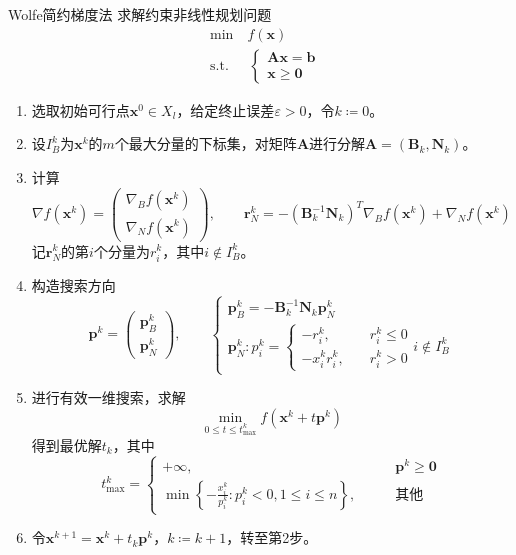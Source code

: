 \documentclass[lang = cn, scheme = chinese, thmcnt = section]{elegantbook}
\newcommand{\bs}{\boldsymbol}          %
\newcommand{\col}{\coloneqq}
\begin{document}
\begin{theorem}{Wolfe简约梯度法}
	求解约束非线性规划问题
	\begin{align*}
		& \text{min}  \quad f(\bs{x})\\
		& \text{s.t.} \;\, \quad \begin{cases}
			\bs{A} \bs{x} = \bs{b}\\
			\bs{x} \ge \bs{0}
		\end{cases}
	\end{align*}
	\begin{enumerate}
		\item 选取初始可行点$\bs{x}^0\in X_l$，给定终止误差$\varepsilon>0$，令$k\col 0$。
		\item 设$I_B^k$为$\bs{x}^k$的$m$个最大分量的下标集，对矩阵$\bs{A}$进行分解$\bs{A}=(\bs{B}_k,\bs{N}_k)$。
		\item 计算
		$$
		\nabla f(\bs{x}^k)=\begin{pmatrix}
			\nabla_B f(\bs{x}^k)\\
			\nabla_N f(\bs{x}^k)
		\end{pmatrix},\qquad
		\bs{r}_N^k
		=-(\bs{B}_k^{-1}\bs{N}_k)^T\nabla_Bf(\bs{x}^k)+\nabla_Nf(\bs{x}^k)
		$$
		记$\bs{r}_N^k$的第$i$个分量为$r_i^k$，其中$i\notin I_B^k$。
		\item 构造搜索方向%
		$$
		\bs{p}^k=\begin{pmatrix}
			\bs{p}^k_B\\
			\bs{p}^k_N
		\end{pmatrix},\qquad 
		\begin{cases}
			\bs{p}_B^k=-\bs{B}^{-1}_k\bs{N}_k\bs{p}_N^k\\
			\bs{p}_N^k:p_i^k=\begin{cases}
				-r_i^k,\quad & r_i^k\le 0\\
				-x_i^kr_i^k,\quad & r_i^k>0
			\end{cases}i\notin I_B^k
		\end{cases}
		$$
		\item 进行有效一维搜索，求解%
		$$
		\min_{0\le t \le t_{\text{max}}^k}f(\bs{x}^k+t\bs{p}^k)
		$$
		得到最优解$t_k$，其中%
		$$
		t_{\text{max}}^k=\begin{cases}
			+\infty,\qquad & \bs{p}^k\ge \bs{0}\\
			\min\left\{ -\frac{x_i^k}{p_i^k}:p_i^k<0,1\le i \le n \right\},\qquad & \text{其他}
		\end{cases}
		$$
		\item 令$\bs{x}^{k+1}=\bs{x}^k+t_k\bs{p}^k$，$k\col k+1$，转至第2步。
	\end{enumerate}
\end{theorem}
\end{document}
